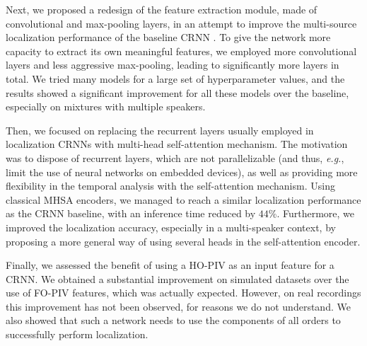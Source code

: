 Next, we proposed a redesign of the feature extraction module, made of convolutional and max-pooling layers, in an attempt to improve the multi-source localization performance of the baseline CRNN \cite{perotin_crnn-based_2019}. To give the network more capacity to extract its own meaningful features, we employed more convolutional layers and less aggressive max-pooling, leading to significantly more layers in total. We tried many models for a large set of hyperparameter values, and the results showed a significant improvement for all these models over the baseline, especially on mixtures with multiple speakers.

Then, we focused on replacing the recurrent layers usually employed in localization CRNNs with multi-head self-attention mechanism. The motivation was to dispose of recurrent layers, which are not parallelizable (and thus, \emph{e.g.}, limit the use of neural networks on embedded devices), as well as providing more flexibility in the temporal analysis with the self-attention mechanism. Using classical MHSA encoders, we managed to reach a similar localization performance as the CRNN baseline, with an inference time reduced by $44$\%. Furthermore, we improved the localization accuracy, especially in a multi-speaker context, by proposing a more general way of using several heads in the self-attention encoder.

Finally, we assessed the benefit of using a HO-PIV as an input feature for a CRNN. We obtained a substantial improvement on simulated datasets over the use of FO-PIV features, which was actually expected. However, on real recordings this improvement has not been observed, for reasons we do not understand. We also showed that such a network needs to use the components of all orders to successfully perform localization.

